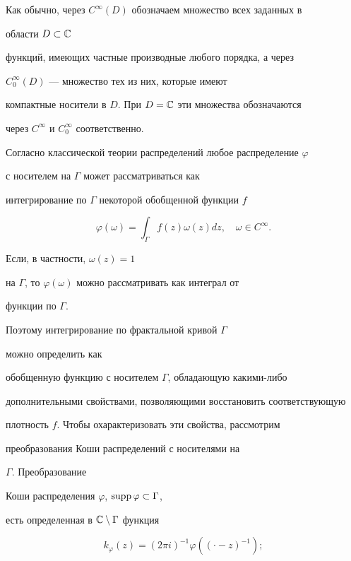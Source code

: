  


Как обычно, через $C^\infty(D)$ обозначаем множество всех заданных в 


области $D\subset\Bbb C$ 


функций, имеющих частные производные любого порядка, а через 


$C^\infty_0(D)$ --- множество тех из них, которые имеют 


компактные носители в $D$. При $D=\Bbb C$ эти множества обозначаются 


через $C^\infty$ и $C^\infty_0$ соответственно. 


 


Согласно классической теории распределений любое распределение $\varphi$ 


с носителем на $\Gamma$ может рассматриваться как 


интегрирование по $\Gamma$ некоторой обобщенной функции $f$


$$ 


\varphi(\omega)=\int_\Gamma f(z)\omega(z)dz,\quad 


\omega\in C^\infty. 


$$ 


Если, в частности, $\omega(z)=1$ 


на $\Gamma$, то $\varphi(\omega)$ можно рассматривать как интеграл от 


функции по $\Gamma$.


 


Поэтому интегрирование по фрактальной кривой $\Gamma$ 


можно определить как 


обобщенную функцию с носителем $\Gamma$, обладающую какими-либо 


дополнительными свойствами, позволяющими восстановить соответствующую 


плотность $f$. Чтобы охарактеризовать эти свойства, рассмотрим 


преобразования Коши распределений с носителями на 


$\Gamma$. Преобразование 


Коши распределения $\varphi$, $\operatorname{supp}\varphi\subset\Gamma$, 


есть определенная в $\Bbb C\setminus\Gamma$ функция 


$$ 


k_\varphi(z)=(2\pi i)^{-1}\varphi((\cdot-z)^{-1}); 


$$ 


